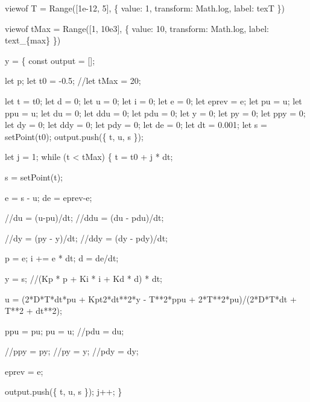\documentclass[
  letterpaper,
  DIV=11]{scrreprt}
\newenvironment{Shaded}{\begin{snugshade}}{\end{snugshade}}
\newcommand{\NormalTok}[1]{\textcolor[rgb]{0.00,0.23,0.31}{#1}}
\begin{document}
\begin{Shaded}
\begin{Highlighting}[]
\NormalTok{viewof T = Range([1e{-}12, 5], \{}
\NormalTok{  value: 1,}
\NormalTok{  transform: Math.log,}
\NormalTok{  label: tex\textasciigrave{}T\textasciigrave{}}
\NormalTok{\})}

\NormalTok{viewof tMax = Range([1, 10e3], \{}
\NormalTok{  value: 10,}
\NormalTok{  transform: Math.log,}
\NormalTok{  label: tex\textasciigrave{}t\_\{max\}\textasciigrave{}}
\NormalTok{\})}

\NormalTok{y = \{}
\NormalTok{  const output = [];}

\NormalTok{  let p; }
\NormalTok{  let t0 = {-}0.5;}
\NormalTok{  //let tMax = 20;}

\NormalTok{  let t = t0;}
\NormalTok{  let d = 0;}
\NormalTok{  let u = 0;}
\NormalTok{  let i = 0;}
\NormalTok{  let e = 0;}
\NormalTok{  let eprev = e;}
\NormalTok{  let pu = u;}
\NormalTok{  let ppu = u;}
\NormalTok{  let du = 0;}
\NormalTok{  let ddu = 0;}
\NormalTok{  let pdu = 0;}
\NormalTok{  let y = 0;}
\NormalTok{  let py = 0;}
\NormalTok{  let ppy = 0;}
\NormalTok{  let dy = 0;}
\NormalTok{  let ddy = 0;}
\NormalTok{  let pdy = 0;}
\NormalTok{  let de = 0;}
\NormalTok{  let dt = 0.001;}
\NormalTok{  let s = setPoint(t0);}
\NormalTok{  output.push(\{ t, u, s \});}

\NormalTok{  let j = 1;}
\NormalTok{  while (t \textless{} tMax) \{}
\NormalTok{    t = t0 + j * dt;}

\NormalTok{    s = setPoint(t);}
   
\NormalTok{    e = s {-} u;}
\NormalTok{    de = eprev{-}e;}

\NormalTok{    //du = (u{-}pu)/dt;}
\NormalTok{    //ddu = (du {-} pdu)/dt;}

\NormalTok{    //dy = (py {-} y)/dt;}
\NormalTok{    //ddy = (dy {-} pdy)/dt;}

\NormalTok{    p = e;}
\NormalTok{    i += e * dt;}
\NormalTok{    d = de/dt;}

\NormalTok{    y = s; //(Kp * p + Ki * i + Kd * d) * dt;}
    
\NormalTok{    u = (2*D*T*dt*pu + Kpt2*dt**2*y {-} T**2*ppu + 2*T**2*pu)/(2*D*T*dt + T**2 + dt**2);}

\NormalTok{    ppu = pu;}
\NormalTok{    pu = u;}
\NormalTok{    //pdu = du;}

\NormalTok{    //ppy = py;}
\NormalTok{    //py = y;}
\NormalTok{    //pdy = dy;}

\NormalTok{    eprev = e;}

\NormalTok{    output.push(\{ t, u, s \});}
\NormalTok{    j++;}
\NormalTok{  \}}


\end{Highlighting}
\end{Shaded}
\end{document}
